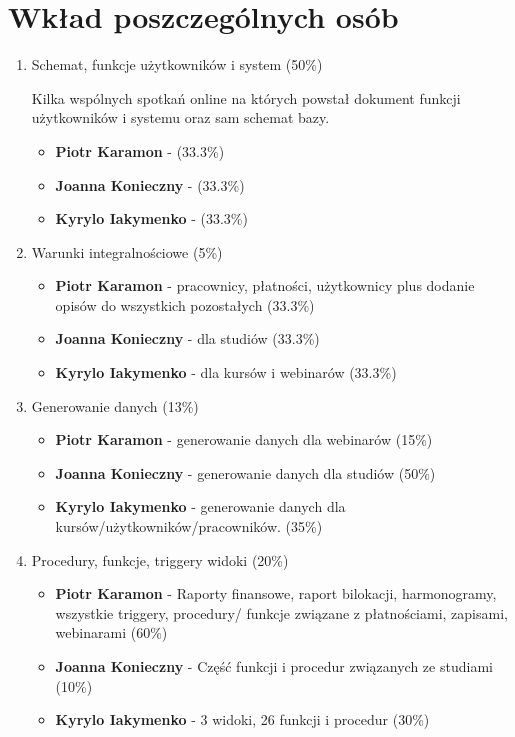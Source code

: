 \documentclass[11pt]{article}
\author{Piotr Karamon}
\date{\today}
\title{}
\begin{document}
\tableofcontents

\section{Wkład poszczególnych osób}
\label{sec:orga8edbc3}
\begin{enumerate}
\item Schemat, funkcje użytkowników i system (50\%)

Kilka wspólnych spotkań online na których powstał dokument funkcji użytkowników i systemu oraz sam schemat bazy.
\begin{itemize}
\item \textbf{Piotr Karamon} - (33.3\%)
\item \textbf{Joanna Konieczny} - (33.3\%)
\item \textbf{Kyrylo Iakymenko} - (33.3\%)
\end{itemize}
\item Warunki integralnościowe (5\%)
\begin{itemize}
\item \textbf{Piotr Karamon} - pracownicy, płatności, użytkownicy plus dodanie opisów do wszystkich pozostałych (33.3\%)
\item \textbf{Joanna Konieczny} - dla studiów (33.3\%)
\item \textbf{Kyrylo Iakymenko} - dla kursów i webinarów (33.3\%)
\end{itemize}
\item Generowanie danych (13\%)
\begin{itemize}
\item \textbf{Piotr Karamon} - generowanie danych dla webinarów (15\%)
\item \textbf{Joanna Konieczny} - generowanie danych dla studiów (50\%)
\item \textbf{Kyrylo Iakymenko} - generowanie danych dla kursów/użytkowników/pracowników. (35\%)
\end{itemize}
\item Procedury, funkcje, triggery widoki (20\%)
\begin{itemize}
\item \textbf{Piotr Karamon} - Raporty finansowe, raport bilokacji, harmonogramy, wszystkie triggery,
procedury/ funkcje związane z płatnościami, zapisami, webinarami (60\%)
\item \textbf{Joanna Konieczny} - Część funkcji i procedur związanych ze studiami (10\%)
\item \textbf{Kyrylo Iakymenko} - 3 widoki, 26 funkcji i procedur (30\%)

\end{itemize}
\end{enumerate}
\end{document}
